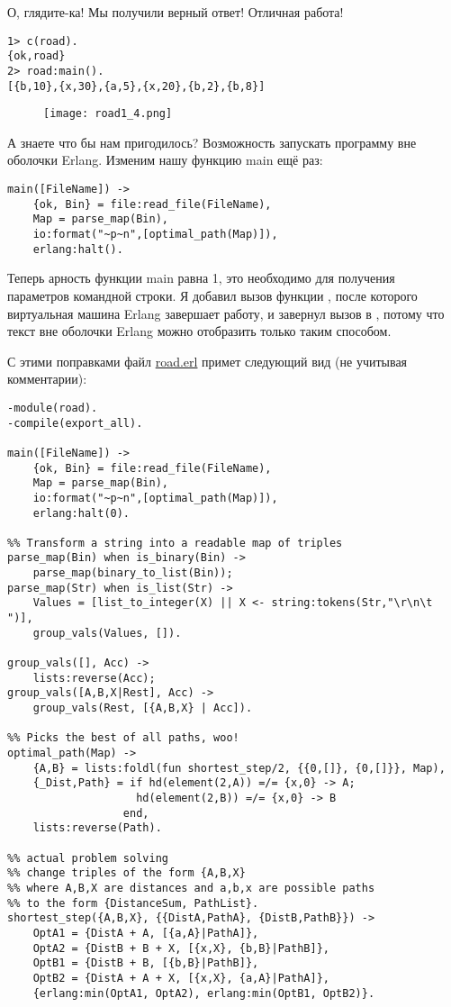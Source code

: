 О, глядите\--ка!
Мы получили верный ответ!
Отличная работа!
\begin{lstlisting}[style=erlang]
1> c(road).
{ok,road}
2> road:main().
[{b,10},{x,30},{a,5},{x,20},{b,2},{b,8}]
\end{lstlisting}

\begin{figure}[h!]
    \texttt{[image: road1\_4.png]}
\end{figure}

А знаете что бы нам пригодилось?
Возможность запускать программу вне оболочки Erlang.
Изменим нашу функцию main ещё раз:
\begin{lstlisting}[style=erlang]
main([FileName]) ->
    {ok, Bin} = file:read_file(FileName),
    Map = parse_map(Bin),
    io:format("~p~n",[optimal_path(Map)]),
    erlang:halt().
\end{lstlisting}

Теперь арность функции main равна 1, это необходимо для получения параметров командной строки.
Я добавил вызов функции , после которого виртуальная машина Erlang завершает работу, и завернул вызов  в , потому что текст вне оболочки Erlang можно отобразить только таким способом.

С этими поправками файл \href{http://learnyousomeerlang.com/static/erlang/road.erl}{road.erl} примет следующий вид (не учитывая комментарии):
\begin{lstlisting}[style=erlang]
-module(road).
-compile(export_all).
 
main([FileName]) ->
    {ok, Bin} = file:read_file(FileName),
    Map = parse_map(Bin),
    io:format("~p~n",[optimal_path(Map)]),
    erlang:halt(0).
 
%% Transform a string into a readable map of triples
parse_map(Bin) when is_binary(Bin) ->
    parse_map(binary_to_list(Bin));
parse_map(Str) when is_list(Str) ->
    Values = [list_to_integer(X) || X <- string:tokens(Str,"\r\n\t ")],
    group_vals(Values, []).
 
group_vals([], Acc) ->
    lists:reverse(Acc);
group_vals([A,B,X|Rest], Acc) ->
    group_vals(Rest, [{A,B,X} | Acc]).
 
%% Picks the best of all paths, woo!
optimal_path(Map) ->
    {A,B} = lists:foldl(fun shortest_step/2, {{0,[]}, {0,[]}}, Map),
    {_Dist,Path} = if hd(element(2,A)) =/= {x,0} -> A;
                    hd(element(2,B)) =/= {x,0} -> B
                  end,
    lists:reverse(Path).
 
%% actual problem solving
%% change triples of the form {A,B,X}
%% where A,B,X are distances and a,b,x are possible paths
%% to the form {DistanceSum, PathList}.
shortest_step({A,B,X}, {{DistA,PathA}, {DistB,PathB}}) ->
    OptA1 = {DistA + A, [{a,A}|PathA]},
    OptA2 = {DistB + B + X, [{x,X}, {b,B}|PathB]},
    OptB1 = {DistB + B, [{b,B}|PathB]},
    OptB2 = {DistA + A + X, [{x,X}, {a,A}|PathA]},
    {erlang:min(OptA1, OptA2), erlang:min(OptB1, OptB2)}.
\end{lstlisting}


